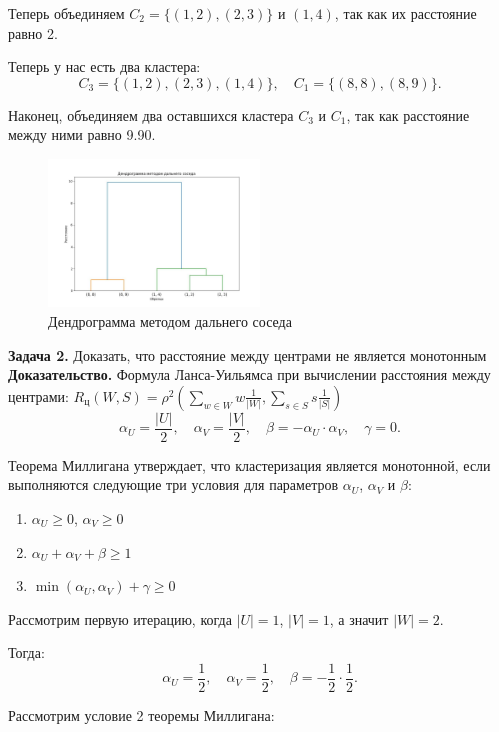 Теперь объединяем \( C_2 = \{(1, 2), (2, 3)\} \) и \( (1, 4) \), так как их расстояние равно 2.

Теперь у нас есть два кластера:
\[
C_3 = \{(1, 2), (2, 3), (1, 4)\}, \quad C_1 = \{(8, 8), (8, 9)\}.
\]

Наконец, объединяем два оставшихся кластера \( C_3 \) и \( C_1 \), так как расстояние между ними равно 9.90.

\begin{figure}[h!]
    \centering
    \includegraphics[width=0.5\textwidth]{png/figure1.jpg} %
    \caption{Дендрограмма методом дальнего соседа}
\end{figure}


\textbf{Задача 2.} Доказать, что расстояние между центрами не является монотонным
\textbf{Доказательство.}
Формула Ланса-Уильямса при вычислении расстояния между центрами: 
$R_{\text{ц}}(W, S) = \rho^2 \left( \sum_{w \in W} w \frac{1}{|W|} , \sum_{s \in S} s \frac{1}{|S|} \right)$
\[
\alpha_U = \frac{|U|}{2}, \quad \alpha_V = \frac{|V|}{2}, \quad \beta = -\alpha_U \cdot \alpha_V, \quad \gamma = 0.
\]

Теорема Миллигана утверждает, что кластеризация является монотонной, если выполняются следующие три условия для параметров \( \alpha_U \), \( \alpha_V \) и \( \beta \):

\begin{enumerate}
    \item \( \alpha_U \geq 0 \), \( \alpha_V \geq 0 \)
    \item \( \alpha_U + \alpha_V + \beta \geq 1 \)
    \item \( \min(\alpha_U, \alpha_V) + \gamma \geq 0 \)
\end{enumerate}

Рассмотрим первую итерацию, когда $|U|=1$, $|V|=1$, а значит $|W|=2$.

Тогда:
\[
\alpha_U = \frac{1}{2}, \quad \alpha_V = \frac{1}{2}, \quad \beta = -\frac{1}{2} \cdot \frac{1}{2}.
\]

Рассмотрим условие 2 теоремы Миллигана:

